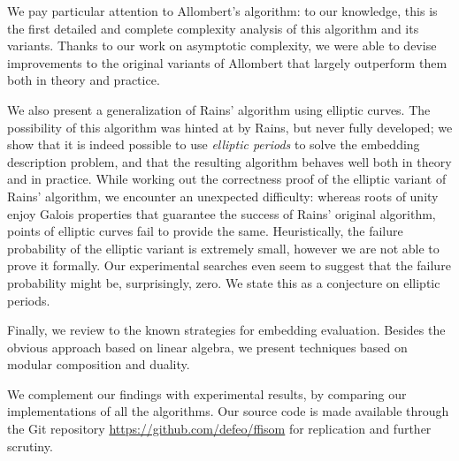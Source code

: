 \documentclass[12pt]{article}
\begin{document}
We pay particular attention to Allombert's algorithm:
to our knowledge, this is the first detailed and complete complexity
analysis of this algorithm and its variants. %
Thanks to our work on asymptotic complexity, we were able to devise
improvements to the original variants of Allombert that largely
outperform them both in theory and practice. %

We also present a generalization of Rains' algorithm using elliptic
curves. %
The possibility of this algorithm was hinted at by Rains, but never
fully developed; we show that it is indeed possible to use
\emph{elliptic periods} to solve the embedding description problem,
and that the resulting algorithm behaves well both in theory and in
practice. %
While working out the correctness proof of the elliptic variant of
Rains' algorithm, we encounter an unexpected difficulty: whereas roots
of unity enjoy Galois properties that guarantee the success of Rains'
original algorithm, points of elliptic curves fail to provide the
same. %
Heuristically, the failure probability of the elliptic variant is
extremely small, however we are not able to prove it formally. %
Our experimental searches even seem to suggest that the failure
probability might be, surprisingly, zero. %
We state this as a conjecture on elliptic periods.

Finally, we review to the known strategies for embedding
evaluation. Besides the obvious approach based on linear algebra, we
present techniques based on modular composition and duality.

We complement our findings with experimental results, by comparing our
implementations of all the algorithms. Our source code is made
available through the Git repository
\url{https://github.com/defeo/ffisom} for replication and further
scrutiny.



\end{document}
